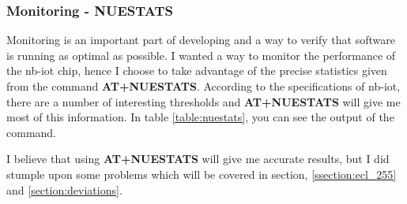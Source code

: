 \documentclass[USenglish]{ifimaster}  %
\begin{document}
\subsubsection{Monitoring - NUESTATS}
Monitoring is an important part of developing and a way to verify that software is running as optimal as possible. I wanted a way to monitor the performance of the \acrshort{nb-iot} chip, hence I choose to take advantage of the precise statistics given from the command \textbf{AT+NUESTATS}. According to the specifications of \acrshort{nb-iot}, there are a number of interesting thresholds and \textbf{AT+NUESTATS} will give me most of this information. In table \vref{table:nuestats}, you can see the output of the command.

\begin{table}[H]
\centering
{}
\caption{\textbf{NUESTATS} command}
\label{table:nuestats}
\end{table}

I believe that using \textbf{AT+NUESTATS} will give me accurate results, but I did stumple upon some problems which will be covered in section, \vref{ssection:ecl_255} and \vref{section:deviations}.
\end{document}
